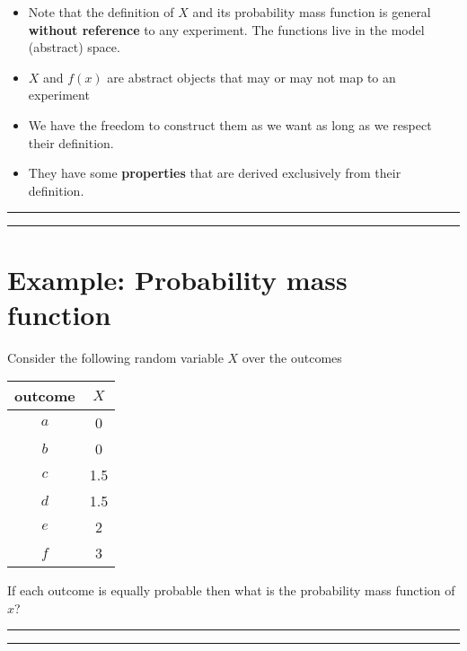 \documentclass[
]{book}
\begin{document}
\begin{itemize}
\item
  Note that the definition of \(X\) and its probability mass function is general \textbf{without reference} to any experiment. The functions live in the model (abstract) space.
\item
  \(X\) and \(f(x)\) are abstract objects that may or may not map to an experiment
\item
  We have the freedom to construct them as we want as long as we respect their definition.
\item
  They have some \textbf{properties} that are derived exclusively from their definition.
\end{itemize}

\begin{center}\rule{0.5\linewidth}{0.5pt}\end{center}

\begin{center}\rule{0.5\linewidth}{0.5pt}\end{center}

\hypertarget{example-probability-mass-function}{%
\section{Example: Probability mass function}\label{example-probability-mass-function}}

Consider the following random variable \(X\) over the outcomes

\begin{longtable}[]{@{}cc@{}}
\toprule
outcome & \(X\) \\
\midrule
\endhead
\(a\) & 0 \\
\(b\) & 0 \\
\(c\) & 1.5 \\
\(d\) & 1.5 \\
\(e\) & 2 \\
\(f\) & 3 \\
\bottomrule
\end{longtable}

If each outcome is equally probable then what is the probability mass function of \(x\)?

\begin{center}\rule{0.5\linewidth}{0.5pt}\end{center}

\begin{center}\rule{0.5\linewidth}{0.5pt}\end{center}
\end{document}
